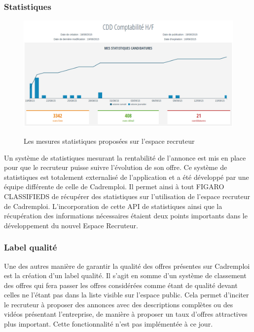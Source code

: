 \subsubsection{Statistiques}
\label{subs:Statistiques}
\begin{figure}[h]
  \begin{center}
    \hspace*{-1in}
    \includegraphics[width=1.2\textwidth]{Pictures/stats.png}
    \label{pic:suivi client backoffice}
    \caption{Les mesures statistiques proposées sur l'espace recruteur}
  \end{center}
\end{figure}
Un système de statistiques mesurant la rentabilité de l'annonce est mis en place pour que le recruteur puisse suivre l'évolution de son offre.
Ce système de statistiques est totalement externalisé de l'application et a été développé par une équipe différente de celle de Cadremploi.
Il permet ainsi à tout FIGARO CLASSIFIEDS de récupérer des statistiques sur l'utilisation de l'espace recruteur de Cadremploi.
L'incorporation de cette API de statistiques ainsi que la récupération des informations nécessaires étaient deux points importants dans le développement du nouvel Espace Recruteur.
\subsubsection{Label qualité}
\label{subs:Label qualité}
Une des autres manière de garantir la qualité des offres présentes sur Cadremploi est la création d'un label qualité.
Il s'agit en somme d'un système de classement des offres qui fera passer les offres considérées comme étant de qualité devant celles ne l'étant pas dans la liste visible sur l'espace public.
Cela permet d'inciter le recruteur à proposer des annonces avec des descriptions complètes ou des vidéos présentant l'entreprise, de manière à proposer un taux d'offres attractives plus important.
Cette fonctionnalité n'est pas implémentée à ce jour.
